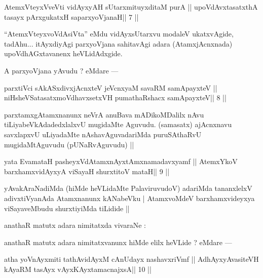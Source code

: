\begin{shl}
AtemxVteyxVveVti vidAyxyAH sUtarxmituyxditaM purA ||
upoVdAvxtasatxthA tasayx pArxgukatxH saparxyoVjanaH\hfill || 7 ||
\end{shl}

\begin{artha}
``AtemxVteyxvoVdAsiVta'' eMdu vidAyxsUtarxvu modaleV ukatxvAgide, tadAhu... itAyxdiyAgi parxyoVjana sahitavAgi adara (AtamxjAcnxnada) upoVdhAGxtavanenx heVLidAdxgide.
\end{artha} 
 
\begin{artha}
A parxyoVjana yAvudu ? eMdare ---
\end{artha}

\begin{shl}
parxtiVci sAkASxdivxjAcnxteV jeVcnxyaM savaRM samApayxteV ||
niHsheVSatasatxmoVdhavxsetxVH pumathaRshacx samApayxteV\hfill || 8 ||
\end{shl}

\begin{artha}
parxtamxgAtamxnanunx neVrA anuBava mADikoMDalilx nAvu tiLiyabeVkAdadedxlalxvU mugidaMte Aguvudu. (samasatx) ajAcnxnavu savxlapxvU uLiyadaMte nAshavAguvadariMda puruSAthaRvU mugidaMtAguvudu (pUNaRvAguvudu) ||
\end{artha}

\begin{shl}
yata EvamataH pasheyxVdAtamxnAyxtAmxnamadavxyamf ||
AtemxYkoV barxhamxvidAyxyA viSayaH shurxtitoV mataH\hfill || 9 ||
\end{shl}

\begin{artha}
yAvakAraNadiMda (hiMde heVLidaMte PalaviruvudoV) adariMda tananxlelxV adivxtiVyanAda Atamxnanunx kANabeVku | AtamxvoMdeV barxhamxvideyxya viSayaveMbudu shurxtiyiMda tiLidide || 
\end{artha} 
 
\begin{artha}

anathaR matutx adara nimitatxda vivaraNe :
\end{artha} 
 
\begin{artha}
anathaR matutx adara nimitatxvanunx hiMde elilx heVLide ? eMdare --- 
\end{artha}

\begin{shl}
atha yoV\s nAyxmiti tathA\s vidAyxM cAnUdayx nashavxriVmf ||
A\s dhAyxyAvasiteVH kAyaRM tasAyx vAyxKAyxtamacnajxsA\hfill || 10 ||
\end{shl}

